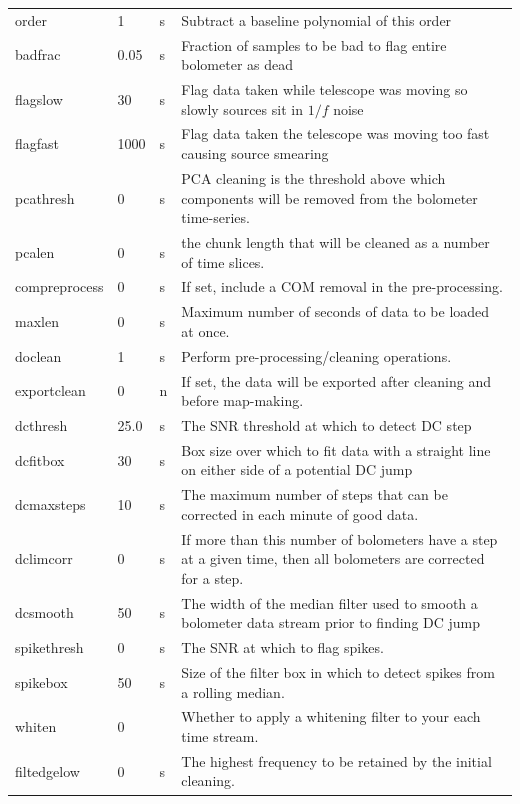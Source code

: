 \documentclass[twoside,11pt]{article}
\newenvironment{latexonly}{}{}
\renewcommand{\_}{\texttt{\symbol{95}}}
\begin{document}
\begin{latexonly}
\begin{table}
\begin{center}
\begin{footnotesize}
\begin{tabular}{|p{2.1cm}|p{0.8cm}|p{0.2cm}|p{11.2cm}|}
order & 1 &s &Subtract a baseline polynomial of this order\\
badfrac & 0.05 &s& Fraction of samples to be bad to flag entire bolometer
                        as dead\\
flagslow & 30 & s&Flag data taken while telescope was moving so slowly
                        sources sit in $1/f$ noise\\
flagfast & 1000 &s& Flag data taken the telescope was moving too fast causing source
                        smearing\\
pcathresh & 0 &s& PCA cleaning is the threshold above which components
                        will be removed from the bolometer time-series.\\
pcalen & 0 &s &the chunk length that will be cleaned as a number of time slices.\\
compreprocess& 0 &s& If set, include a COM removal in the pre-processing.\\
maxlen& 0 &s &Maximum number of seconds of data to be loaded at once.\\
doclean& 1 &s&Perform pre-processing/cleaning operations. \\
exportclean& 0 &n&If set, the data will be exported after cleaning and before map-making. \\
dcthresh & 25.0 &s& The SNR threshold at which to detect DC step\\
dcfitbox & 30 &s& Box size over which to fit data with a straight
                        line on either side of a potential DC jump\\
dcmaxsteps & 10 &s& The maximum number of steps that can be corrected
                        in each minute of good data.\\
dclimcorr & 0 &s& If more than this number of bolometers have a step at
                        a given time, then all bolometers are corrected for
                        a step.\\
dcsmooth & 50 &s& The width of the median filter used to smooth a
                        bolometer data stream prior to finding DC jump\\
spikethresh & 0 &s& The SNR at which to flag spikes.\\
spikebox & 50 &s& Size of the filter box in which to detect spikes from a rolling median.\\
whiten & 0 &&Whether to apply a whitening filter to your each time stream. \\
filt\_edgelow & 0 &s&The highest frequency to be retained by the initial cleaning. \\

\end{tabular}
\end{footnotesize}
\end{center}
\end{table}
\end{latexonly}
\end{document}
